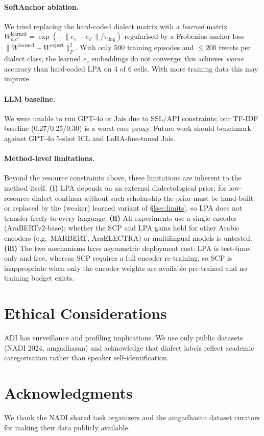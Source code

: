 \documentclass[11pt,a4paper,twocolumn]{article}
\begin{document}
\paragraph{SoftAnchor ablation.}
We tried replacing the hard-coded dialect matrix with a
\emph{learned} matrix $W^{\text{learned}}_{c, c'} =
\exp(-\|e_c - e_{c'}\|/\tau_{\text{ling}})$ regularised by a
Frobenius anchor loss $\|W^{\text{learned}} - W^{\text{expert}}\|_F^2$.
With only 500 training episodes and $\le 200$ tweets per dialect
class, the learned $e_c$ embeddings do not converge; this
achieves \emph{worse} accuracy than hard-coded LPA on 4 of 6
cells. With more training data this may improve.

\paragraph{LLM baseline.}
We were unable to run GPT-4o or Jais due to SSL/API constraints;
our TF-IDF baseline (0.27/0.25/0.30) is a worst-case proxy.
Future work should benchmark against GPT-4o 5-shot ICL and
LoRA-fine-tuned Jais.

\paragraph{Method-level limitations.}
Beyond the resource constraints above, three limitations are
inherent to the method itself. \textbf{(i)} LPA depends on an
external dialectological prior; for low-resource dialect
continua without such scholarship the prior must be hand-built
or replaced by the (weaker) learned variant of
\S\ref{sec:limits}, so LPA does not transfer freely to every
language. \textbf{(ii)} All experiments use a single encoder
(AraBERTv2-base); whether the SCP and LPA gains hold for other
Arabic encoders (e.g.\ MARBERT, AraELECTRA) or multilingual
models is untested. \textbf{(iii)} The two mechanisms have
asymmetric deployment cost: LPA is test-time-only and free,
whereas SCP requires a full encoder re-training, so SCP is
inappropriate when only the encoder weights are available
pre-trained and no training budget exists.

\section{Ethical Considerations}
ADI has surveillance and profiling implications. We use only
public datasets (NADI 2024, amgadhasan) and acknowledge that
dialect labels reflect academic categorisation rather than
speaker self-identification.

\section*{Acknowledgments}
We thank the NADI shared task organizers and the amgadhasan
dataset curators for making their data publicly available.



\end{document}
